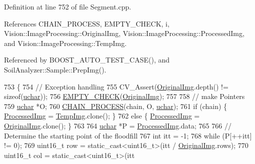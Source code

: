 Definition at line 752 of file Segment.\+cpp.



References C\+H\+A\+I\+N\+\_\+\+P\+R\+O\+C\+E\+S\+S, E\+M\+P\+T\+Y\+\_\+\+C\+H\+E\+C\+K, i, Vision\+::\+Image\+Processing\+::\+Original\+Img, Vision\+::\+Image\+Processing\+::\+Processed\+Img, and Vision\+::\+Image\+Processing\+::\+Temp\+Img.



Referenced by B\+O\+O\+S\+T\+\_\+\+A\+U\+T\+O\+\_\+\+T\+E\+S\+T\+\_\+\+C\+A\+S\+E(), and Soil\+Analyzer\+::\+Sample\+::\+Prep\+Img().


\begin{DoxyCode}
753     \{
754         \textcolor{comment}{// Exception handling}
755         CV\_Assert(\hyperlink{class_vision_1_1_image_processing_a77c370dab270158a4e9c634e2d3f48e7}{OriginalImg}.depth() != \textcolor{keyword}{sizeof}(\hyperlink{_soil_math_types_8h_a65f85814a8290f9797005d3b28e7e5fc}{uchar}));
756         \hyperlink{_image_processing_8h_a27c4e53b88a0f9f2c097add555131056}{EMPTY\_CHECK}(\hyperlink{class_vision_1_1_image_processing_a77c370dab270158a4e9c634e2d3f48e7}{OriginalImg});
757 
758         \textcolor{comment}{// make Pointers}
759         \hyperlink{_soil_math_types_8h_a65f85814a8290f9797005d3b28e7e5fc}{uchar} *O;
760         \hyperlink{_image_processing_8h_a6e6f0183cb53c76ef458d4fd34e07bcd}{CHAIN\_PROCESS}(chain, O, \hyperlink{_soil_math_types_8h_a65f85814a8290f9797005d3b28e7e5fc}{uchar});
761         \textcolor{keywordflow}{if} (chain) \{ \hyperlink{class_vision_1_1_image_processing_aa7d65742882cd1b2a1e4e9cb68809211}{ProcessedImg} = \hyperlink{class_vision_1_1_image_processing_a5371ad8d6f7aac9d43ee5c902ade7435}{TempImg}.clone(); \}
762         \textcolor{keywordflow}{else} \{ \hyperlink{class_vision_1_1_image_processing_aa7d65742882cd1b2a1e4e9cb68809211}{ProcessedImg} = \hyperlink{class_vision_1_1_image_processing_a77c370dab270158a4e9c634e2d3f48e7}{OriginalImg}.clone(); \}
763 
764         \hyperlink{_soil_math_types_8h_a65f85814a8290f9797005d3b28e7e5fc}{uchar} *P = \hyperlink{class_vision_1_1_image_processing_aa7d65742882cd1b2a1e4e9cb68809211}{ProcessedImg}.data;
765 
766         \textcolor{comment}{// Determine the starting point of the floodfill}
767         \textcolor{keywordtype}{int} itt = -1;
768         \textcolor{keywordflow}{while} (P[++itt] != 0);
769         uint16\_t row = \textcolor{keyword}{static\_cast<}uint16\_t\textcolor{keyword}{>}(itt / \hyperlink{class_vision_1_1_image_processing_a77c370dab270158a4e9c634e2d3f48e7}{OriginalImg}.rows);
770         uint16\_t col = \textcolor{keyword}{static\_cast<}uint16\_t\textcolor{keyword}{>}(itt %

\end{DoxyCode}
